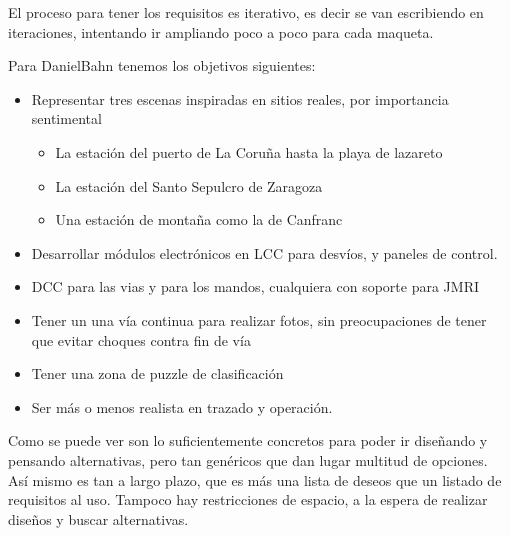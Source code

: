 El proceso para tener los requisitos es iterativo, es decir se van escribiendo en iteraciones,
intentando ir ampliando poco a poco para cada maqueta.

Para DanielBahn tenemos los objetivos  siguientes:
\begin{itemize}
    \item Representar tres escenas inspiradas en sitios reales, por importancia sentimental
          \begin{itemize}
              \item La estación del puerto de La Coruña hasta la playa de lazareto
              \item La estación del Santo Sepulcro de Zaragoza
              \item Una estación de montaña como la de Canfranc
          \end{itemize}
    \item Desarrollar módulos electrónicos en LCC para desvíos, y paneles de control.
    \item DCC para las vias y para los mandos, cualquiera con soporte para JMRI
    \item Tener un una vía continua para realizar fotos, sin preocupaciones de tener que evitar choques contra fin de vía
    \item Tener una zona de puzzle de clasificación
    \item Ser más o menos realista en trazado y operación.
\end{itemize}


Como se puede ver son lo suficientemente concretos para poder ir diseñando y pensando alternativas,
pero tan genéricos que dan lugar multitud de opciones. Así mismo es tan a largo plazo, que es más una lista de
deseos que un listado de requisitos al uso. Tampoco hay restricciones de espacio, a la espera de realizar diseños
y buscar alternativas.

